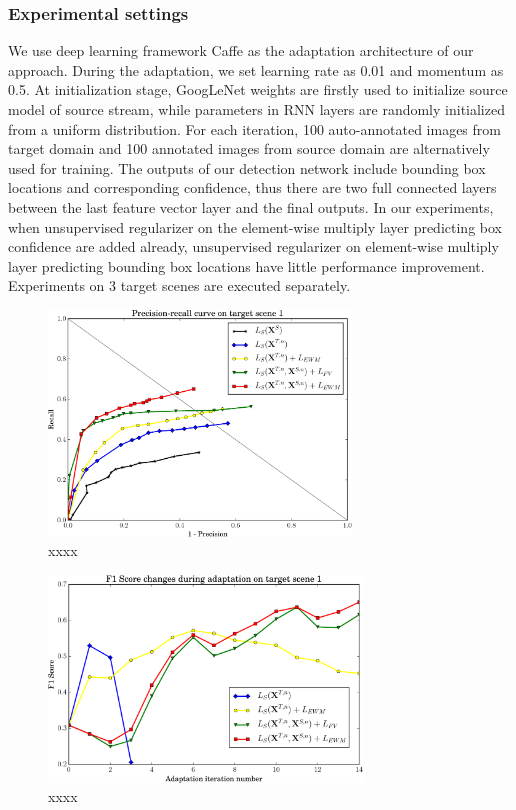 \documentclass[runningheads]{llncs}
\begin{document}
\subsubsection{Experimental settings}
We use deep learning framework Caffe \cite{jia2014caffe} as the adaptation architecture of our approach. During the adaptation, we set learning rate as 0.01 and momentum as 0.5. At initialization stage, GoogLeNet weights are firstly used to initialize source model of source stream, while parameters in RNN layers are randomly initialized from a uniform distribution. For each iteration, 100 auto-annotated images from target domain and 100 annotated images from source domain are alternatively used for training. The outputs of our detection network include bounding box locations and corresponding confidence, thus there are two full connected layers between the last feature vector layer and the final outputs. In our experiments, when unsupervised regularizer on the element-wise multiply layer predicting box confidence are added already, unsupervised regularizer on element-wise multiply layer predicting bounding box locations have little performance improvement. Experiments on 3 target scenes are executed separately.

\begin{figure}
\centering
\includegraphics[height=6cm]{images/pr_curve.pdf}
\caption{xxxx}
\label{fig:pr_curve}
\end{figure}

\begin{figure}
\centering
\includegraphics[height=5.5cm]{images/f1_score.pdf}
\caption{xxxx}
\label{fig:f1_score}
\end{figure}
\end{document}
